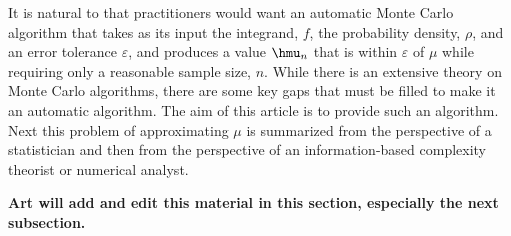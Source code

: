 \documentclass[graybox]{svmult}
\begin{document}
It is natural to that practitioners would want an automatic Monte Carlo algorithm that takes as its input the integrand, $f$, the probability density, $\rho$, and an error tolerance $\varepsilon$, and produces a value $\hmu_n$ that is within $\varepsilon$ of $\mu$ while requiring only a reasonable sample size, $n$.  While there is an extensive theory on Monte Carlo algorithms, there are some key gaps that must be filled to make it an automatic algorithm.  The aim of this article is to provide such an algorithm.  Next this problem of approximating $\mu$ is summarized from the perspective of a statistician and then from the perspective of an information-based complexity theorist or numerical analyst.

{\bf Art will add and edit this material in this section, especially the next subsection.}
\end{document}
